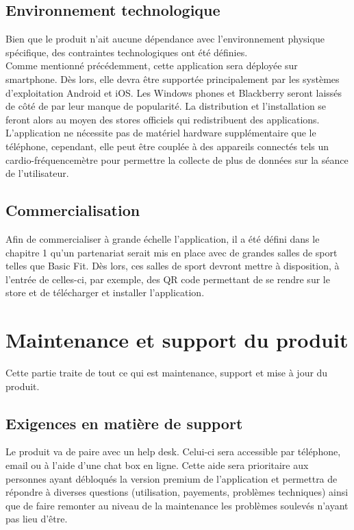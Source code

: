 \subsection*{Environnement technologique}
Bien que le produit n'ait aucune dépendance avec l'environnement physique spécifique, des contraintes technologiques ont été définies.\\

Comme mentionné précédemment, cette application sera déployée sur smartphone. Dès lors, elle devra être supportée principalement par les systèmes d'exploitation Android et iOS. Les Windows phones et Blackberry seront laissés de côté de par leur manque de popularité. La distribution et l'installation se feront alors au moyen des stores officiels qui redistribuent des applications.\\

L'application ne nécessite pas de matériel hardware supplémentaire que le téléphone, cependant, elle peut être couplée à des appareils connectés tels un cardio-fréquencemètre pour permettre la collecte de plus de données sur la séance de l'utilisateur.

\subsection*{Commercialisation}
Afin de commercialiser à grande échelle l'application, il a été défini dans le chapitre 1 qu'un partenariat serait mis en place avec de grandes salles de sport telles que Basic Fit. Dès lors, ces salles de sport devront mettre à disposition, à l'entrée de celles-ci, par exemple, des QR code permettant de se rendre sur le store et de télécharger et installer l'application.

\section{Maintenance et support du produit}
Cette partie traite de tout ce qui est maintenance, support et mise à jour du produit.

\subsection*{Exigences en matière de support}
Le produit va de paire avec un help desk. Celui-ci sera accessible par téléphone, email ou à l'aide d'une chat box en ligne. Cette aide sera prioritaire aux personnes ayant débloqués la version premium de l'application et permettra de répondre à diverses questions (utilisation, payements, problèmes techniques) ainsi que de faire remonter au niveau de la maintenance les problèmes soulevés n'ayant pas lieu d'être.

